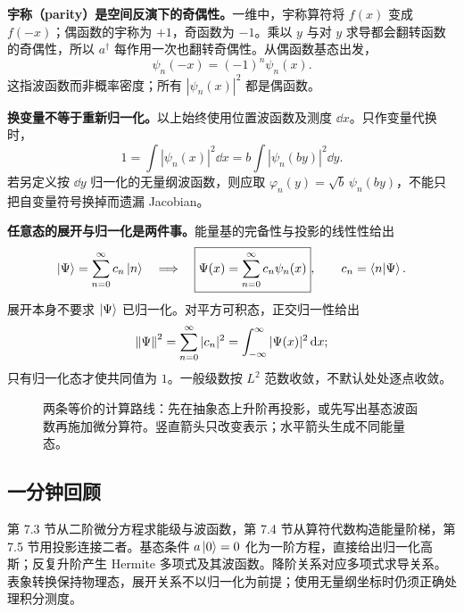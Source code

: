 \textbf{宇称（parity）是空间反演下的奇偶性。}一维中，宇称算符将 $f(x)$ 变成 $f(-x)$；偶函数的宇称为 $+1$，奇函数为 $-1$。乘以 $y$ 与对 $y$ 求导都会翻转函数的奇偶性，所以 $a^\dagger$ 每作用一次也翻转奇偶性。从偶函数基态出发，
\begin{equation}
  \boxed{\psi_n(-x)=(-1)^n\psi_n(x)}.
\end{equation}
这指波函数而非概率密度；所有 $|\psi_n(x)|^2$ 都是偶函数。

\textbf{换变量不等于重新归一化。}以上始终使用位置波函数及测度 $\dd x$。只作变量代换时，
\begin{equation}
  1=\int|\psi_n(x)|^2\dd x
   =b\int|\psi_n(by)|^2\dd y.
\end{equation}
若另定义按 $\dd y$ 归一化的无量纲波函数，则应取
$\varphi_n(y)=\sqrt b\,\psi_n(by)$，不能只把自变量符号换掉而遗漏 Jacobian。

\textbf{任意态的展开与归一化是两件事。}能量基的完备性与投影的线性性给出
\begin{equation}
  \left|\Psi\right\rangle=\sum_{n=0}^{\infty}c_n\left|n\right\rangle
  \quad\Longrightarrow\quad
  \boxed{\Psi(x)=\sum_{n=0}^{\infty}c_n\psi_n(x)},\qquad
  c_n=\left\langle n \middle| \Psi \right\rangle.
\end{equation}
展开本身不要求 $\left|\Psi\right\rangle$ 已归一化。对平方可积态，正交归一性给出
\begin{equation}
  \left\lVert \Psi \right\rVert^2=\sum_{n=0}^{\infty}|c_n|^2
    =\int_{-\infty}^{\infty}|\Psi(x)|^2\mathop{}\!\mathrm{d} x;
\end{equation}
只有归一化态才使共同值为 $1$。一般级数按 $L^2$ 范数收敛，不默认处处逐点收敛。

\begin{figure}[htbp]
  \centering
  \caption{两条等价的计算路线：先在抽象态上升阶再投影，或先写出基态波函数再施加微分算符。竖直箭头只改变表示；水平箭头生成不同能量态。}
\end{figure}

\subsection{一分钟回顾}
第 7.3 节从二阶微分方程求能级与波函数，第 7.4 节从算符代数构造能量阶梯，第 7.5 节用投影连接二者。基态条件 $a\left|0\right\rangle=0$ 化为一阶方程，直接给出归一化高斯；反复升阶产生 Hermite 多项式及其波函数。降阶关系对应多项式求导关系。表象转换保持物理态，展开关系不以归一化为前提；使用无量纲坐标时仍须正确处理积分测度。
